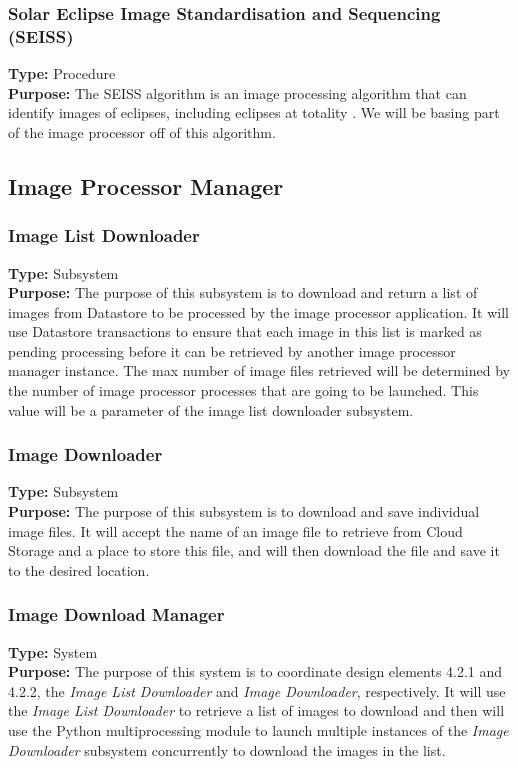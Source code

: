 \documentclass[10pt, onecolumn, draftclsnofoot, letterpaper, compsoc]{IEEEtran}
\begin{document}
\subsubsection{Solar Eclipse Image Standardisation and Sequencing (SEISS)}
\textbf{Type:} Procedure\\
\textbf{Purpose:} The SEISS algorithm is an image processing algorithm that can
identify images of eclipses, including eclipses at totality \cite{imgKrista}. We
will be basing part of the image processor off of this algorithm. \\

\subsection{Image Processor Manager}

    \subsubsection{Image List Downloader}
    \textbf{Type:} Subsystem \\
    \textbf{Purpose:} The purpose of this subsystem is to download and return a list of images from Datastore
    to be processed by the image processor application. It will use Datastore transactions to ensure that each
    image in this list is marked as pending processing before it can be retrieved by another image processor
    manager instance. The max number of image files retrieved will be determined by the number of image
    processor processes that are going to be launched. This value will be a parameter of the image list
    downloader subsystem. \\

    \subsubsection{Image Downloader}
    \textbf{Type:} Subsystem \\
    \textbf{Purpose:} The purpose of this subsystem is to download and save individual image files. It will
    accept the name of an image file to retrieve from Cloud Storage and a place to store this file, and will
    then download the file and save it to the desired location. \\

    \subsubsection{Image Download Manager}
    \textbf{Type:} System \\
    \textbf{Purpose:} The purpose of this system is to coordinate design elements 4.2.1 and 4.2.2, the
    \textit{Image List Downloader} and \textit{Image Downloader}, respectively. It will use the
    \textit{Image List Downloader} to retrieve a list of images to download and then will use the Python
    multiprocessing module to launch multiple instances of the \textit{Image Downloader} subsystem
    concurrently to download the images in the list. \\
\end{document}

